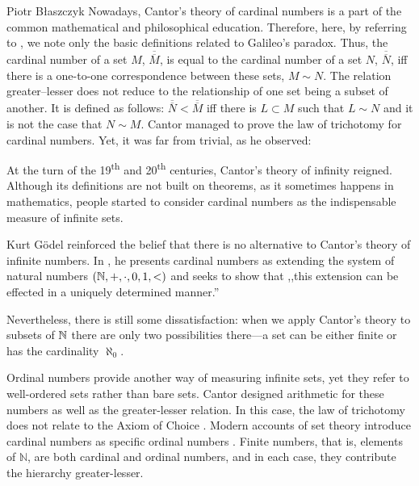 \begin{artengenv}{Piotr Błaszczyk}
Nowadays, Cantor's theory of cardinal numbers is a part of the common mathematical and philosophical education. Therefore, here, by referring to \parencite{ref_C97}, we note only the basic definitions related to Galileo's paradox.   Thus, the cardinal number of a set $M$, $\overline{{\overline M}}$, is equal to  the cardinal number of  a set $N$,
 $\overline{{\overline N}}$,  iff there is a one-to-one correspondence between these sets, $M\sim N$.   The relation greater--lesser does not reduce to the relationship of one set being a subset of another.  It is defined as follows:  $\overline{{\overline N}}< \overline{{\overline M}}$ iff there is $L\subset M$ such that $L\sim N$ and it is not the case that $N\sim M$.   Cantor managed to prove the law of trichotomy for cardinal numbers. Yet, it was far from trivial, as he observed:

At the turn of the 19\textsuperscript{th} and 20\textsuperscript{th} centuries, Cantor's theory of infinity reigned.  Although its definitions are not built on  theorems, as it sometimes happens in mathematics, people started to consider cardinal numbers as the indispensable measure of infinite sets.

Kurt G\"odel reinforced the belief that there is no alternative to Cantor's theory of infinite
numbers. 
In \parencite{ref_kg47}, he presents
cardinal numbers as extending the system of natural numbers $({\mathbb{N}},+, \cdot, 0, 1,<)$ and seeks
to show that ,,this extension can be effected in a uniquely determined manner.''

Nevertheless, there is still some  dissatisfaction: when we apply Cantor's theory to subsets of ${\mathbb{N}}$ there are only two possibilities there---a set can be either finite
or has the cardinality $\aleph_0$. 

Ordinal numbers provide another way of measuring infinite sets, yet they refer to well-ordered sets rather than bare sets. Cantor designed arithmetic for these numbers as well as the greater-lesser relation. In this case, the law of trichotomy does not relate to the Axiom of Choice  \parencite[see][ch. 7]{ref_km78}. Modern accounts of set theory introduce cardinal numbers as specific ordinal numbers \parencite[ch. 3]{ref_tj}.
Finite numbers, that is, elements of $\mathbb N$, are both cardinal and ordinal numbers, and in each case, they contribute the hierarchy greater-lesser.





\end{artengenv}
